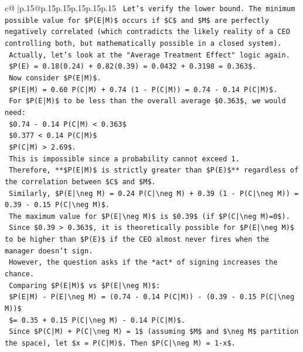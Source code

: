 \documentclass{article}
\begin{document}
{\begin{supertabular}{c@{$\;$}|p{.15\linewidth}@{}p{.15\linewidth}p{.15\linewidth}p{.15\linewidth}p{.15\linewidth}p{.15\linewidth}}
{{{\texttt{    Let's verify the lower bound. The minimum possible value for \$P(E|M)\$ occurs if \$C\$ and \$M\$ are perfectly negatively correlated (which contradicts the likely reality of a CEO controlling both, but mathematically possible in a closed system).} \\
\texttt{    Actually, let's look at the "Average Treatment Effect" logic again.} \\
\texttt{    \$P(E) = 0.18(0.24) + 0.82(0.39) = 0.0432 + 0.3198 = 0.363\$.} \\
\texttt{    Now consider \$P(E|M)\$.} \\
\texttt{    \$P(E|M) = 0.60 P(C|M) + 0.74 (1 {-} P(C|M)) = 0.74 {-} 0.14 P(C|M)\$.} \\
\texttt{    For \$P(E|M)\$ to be less than the overall average \$0.363\$, we would need:} \\
\texttt{    \$0.74 {-} 0.14 P(C|M) < 0.363\$} \\
\texttt{    \$0.377 < 0.14 P(C|M)\$} \\
\texttt{    \$P(C|M) > 2.69\$.} \\
\texttt{    This is impossible since a probability cannot exceed 1.} \\
\texttt{    Therefore, **\$P(E|M)\$ is strictly greater than \$P(E)\$** regardless of the correlation between \$C\$ and \$M\$.} \\
\texttt{    Similarly, \$P(E|\textbackslash{}neg M) = 0.24 P(C|\textbackslash{}neg M) + 0.39 (1 {-} P(C|\textbackslash{}neg M)) = 0.39 {-} 0.15 P(C|\textbackslash{}neg M)\$.} \\
\texttt{    The maximum value for \$P(E|\textbackslash{}neg M)\$ is \$0.39\$ (if \$P(C|\textbackslash{}neg M)=0\$).} \\
\texttt{    Since \$0.39 > 0.363\$, it is theoretically possible for \$P(E|\textbackslash{}neg M)\$ to be higher than \$P(E)\$ if the CEO almost never fires when the manager doesn't sign.} \\
\texttt{    However, the question asks if the *act* of signing increases the chance.} \\
\texttt{    Comparing \$P(E|M)\$ vs \$P(E|\textbackslash{}neg M)\$:} \\
\texttt{    \$P(E|M) {-} P(E|\textbackslash{}neg M) = (0.74 {-} 0.14 P(C|M)) {-} (0.39 {-} 0.15 P(C|\textbackslash{}neg M))\$} \\
\texttt{    \$= 0.35 + 0.15 P(C|\textbackslash{}neg M) {-} 0.14 P(C|M)\$.} \\
\texttt{    Since \$P(C|M) + P(C|\textbackslash{}neg M) = 1\$ (assuming \$M\$ and \$\textbackslash{}neg M\$ partition the space), let \$x = P(C|M)\$. Then \$P(C|\textbackslash{}neg M) = 1{-}x\$.} \\
}}}
\end{supertabular}}
\end{document}
